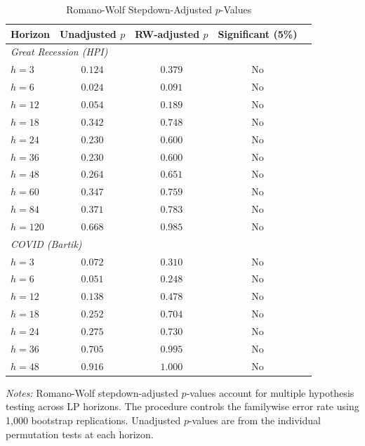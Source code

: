 \begin{table}[H]
\centering
\caption{Romano-Wolf Stepdown-Adjusted $p$-Values}
\begin{threeparttable}
\small
\begin{tabular}{lcccc}
\toprule
Horizon & Unadjusted $p$ & RW-adjusted $p$ & Significant (5\%) \\
\midrule
\multicolumn{4}{l}{\textit{Great Recession (HPI)}} \\[3pt]
$h=3$ & $0.124$ & $0.379$ & No \\
$h=6$ & $0.024$ & $0.091$ & No \\
$h=12$ & $0.054$ & $0.189$ & No \\
$h=18$ & $0.342$ & $0.748$ & No \\
$h=24$ & $0.230$ & $0.600$ & No \\
$h=36$ & $0.230$ & $0.600$ & No \\
$h=48$ & $0.264$ & $0.651$ & No \\
$h=60$ & $0.347$ & $0.759$ & No \\
$h=84$ & $0.371$ & $0.783$ & No \\
$h=120$ & $0.668$ & $0.985$ & No \\
\midrule
\multicolumn{4}{l}{\textit{COVID (Bartik)}} \\[3pt]
$h=3$ & $0.072$ & $0.310$ & No \\
$h=6$ & $0.051$ & $0.248$ & No \\
$h=12$ & $0.138$ & $0.478$ & No \\
$h=18$ & $0.252$ & $0.704$ & No \\
$h=24$ & $0.275$ & $0.730$ & No \\
$h=36$ & $0.705$ & $0.995$ & No \\
$h=48$ & $0.916$ & $1.000$ & No \\
\midrule
\bottomrule
\end{tabular}
\begin{tablenotes}[flushleft]
\small
\item \textit{Notes:} Romano-Wolf stepdown-adjusted $p$-values account for multiple hypothesis testing across LP horizons. The procedure controls the familywise error rate using 1,000 bootstrap replications. Unadjusted $p$-values are from the individual permutation tests at each horizon.
\end{tablenotes}
\end{threeparttable}
\label{tab:romano_wolf}
\end{table}
